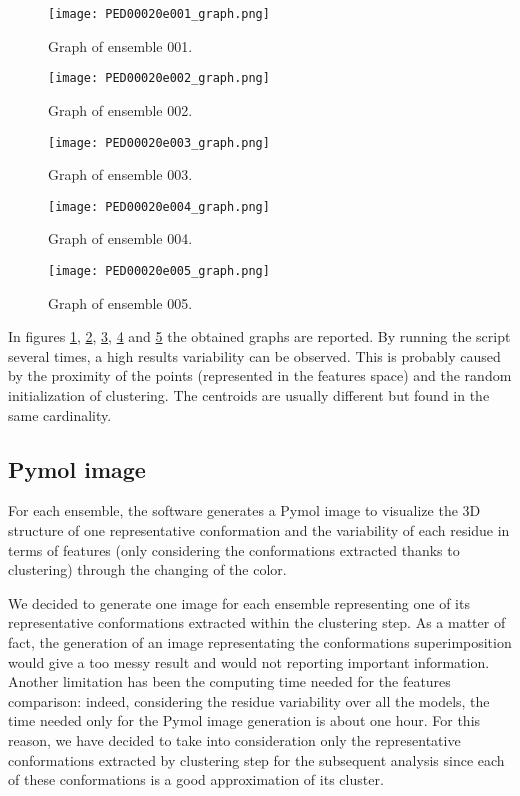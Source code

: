 \begin{figure}[H]
    \centering
	\texttt{[image: PED00020e001\_graph.png]}
	\caption{Graph of ensemble 001.}
	\label{model001}
\end{figure}

\begin{figure}[H]
    \centering
		\texttt{[image: PED00020e002\_graph.png]}
		\caption{Graph of ensemble 002.}
		\label{model002}
\end{figure}

\begin{figure}[H]
    \centering
		\texttt{[image: PED00020e003\_graph.png]}
		\caption{Graph of ensemble 003.}
		\label{model003}
\end{figure}

\begin{figure}[H]
    \centering
		\texttt{[image: PED00020e004\_graph.png]}
		\caption{Graph of ensemble 004.}
		\label{model004}
\end{figure}

\begin{figure}[H]
    \centering
		\texttt{[image: PED00020e005\_graph.png]}
		\caption{Graph of ensemble 005.}
		\label{model005}
\end{figure}


In figures \ref{model001}, \ref{model002}, \ref{model003}, \ref{model004} and \ref{model005} the obtained graphs are reported. By running the script several times, a high results variability can be observed.
This is probably caused by the proximity of the points (represented in the features space) and the random initialization of clustering. The centroids are usually different but found in the same cardinality.



\subsection{Pymol image}
For each ensemble, the software generates a Pymol image to visualize the 3D structure of one representative conformation and the variability of each residue in terms of features (only considering the conformations extracted thanks to clustering) through the changing of the color. %

We decided to generate one image for each ensemble representing one of its representative conformations extracted within the clustering step.
As a matter of fact, the generation of an image representating the conformations superimposition would give a too messy result and would not reporting important information. 
Another limitation has been the computing time needed for the features comparison: indeed, considering the residue variability over all the models, the time needed only for the Pymol image generation is about one hour. For this reason, we have decided to take into consideration only the representative conformations extracted by clustering step for the subsequent analysis since each of these conformations is a good approximation of its cluster.

